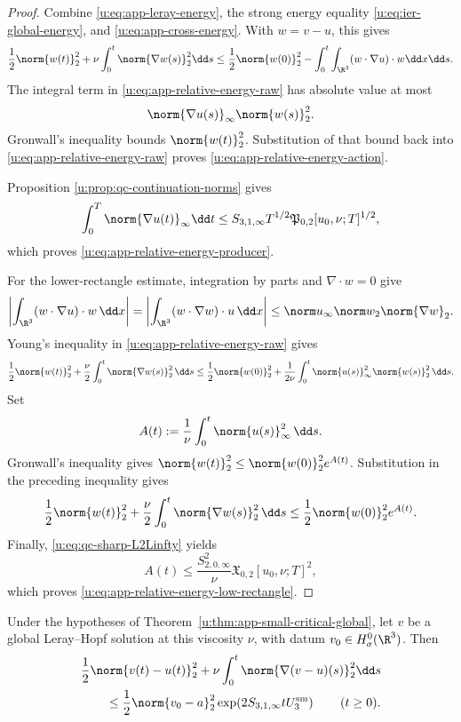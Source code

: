 \begin{proof}
Combine \eqref{u:eq:app-leray-energy}, the strong energy equality
\eqref{u:eq:ier-global-energy}, and \eqref{u:eq:app-cross-energy}.  With
\(w=v-u\), this gives
\begin{equation}
 \frac12\norm{w(t)}_2^2
 +\nu\int_0^t\norm{\nabla w(s)}_2^2\dd s
 \le
 \frac12\norm{w(0)}_2^2
 -\int_0^t\int_{\R^3}(w\cdot\nabla u)\cdot w\dd x\dd s.
 \label{u:eq:app-relative-energy-raw}
\end{equation}
The integral term in \eqref{u:eq:app-relative-energy-raw} has absolute value at
most
\[
 \norm{\nabla u(s)}_\infty\norm{w(s)}_2^2.
\]
Gronwall's inequality bounds \(\norm{w(t)}_2^2\).  Substitution of that
bound back into \eqref{u:eq:app-relative-energy-raw} proves
\eqref{u:eq:app-relative-energy-action}.
\begin{samepage}
Proposition
\ref{u:prop:qc-continuation-norms} gives
\[
 \int_0^T\norm{\nabla u(t)}_\infty\dd t
 \le
 S_{3,1,\infty}T^{1/2}
 \mathfrak P_{0,2}[u_0,\nu;T]^{1/2},
\]
which proves \eqref{u:eq:app-relative-energy-producer}.
\end{samepage}

For the lower-rectangle estimate, integration by parts and
\(\nabla\cdot w=0\) give
\[
 \left|\int_{\R^3}(w\cdot\nabla u)\cdot w\,\dd x\right|
 =\left|\int_{\R^3}(w\cdot\nabla w)\cdot u\,\dd x\right|
 \le\norm u_\infty\norm w_2\norm{\nabla w}_2.
\]
Young's inequality in \eqref{u:eq:app-relative-energy-raw} gives
\begin{align*}
 \frac12\norm{w(t)}_2^2
 +\frac\nu2\int_0^t\norm{\nabla w(s)}_2^2\,\dd s
 \le\frac12\norm{w(0)}_2^2
 +\frac1{2\nu}\int_0^t\norm{u(s)}_\infty^2
 \norm{w(s)}_2^2\,\dd s.
\end{align*}
Set
\[
 A(t):=\frac1\nu\int_0^t\norm{u(s)}_\infty^2\,\dd s.
\]
Gronwall's inequality gives
\(\norm{w(t)}_2^2\le\norm{w(0)}_2^2e^{A(t)}\).  Substitution in the
preceding inequality gives
\[
 \frac12\norm{w(t)}_2^2
 +\frac\nu2\int_0^t\norm{\nabla w(s)}_2^2\,\dd s
 \le\frac12\norm{w(0)}_2^2e^{A(t)}.
\]
Finally, \eqref{u:eq:qc-sharp-L2Linfty} yields
\[
 A(t)\le\frac{S_{2,0,\infty}^2}{\nu}
 \mathfrak X_{0,2}[u_0,\nu;T]^2,
\]
which proves \eqref{u:eq:app-relative-energy-low-rectangle}.
\end{proof}

\begin{corollary}
\label{u:cor:app-small-weak-stability}
Under the hypotheses of Theorem~\ref{u:thm:app-small-critical-global}, let
\(v\) be a global Leray--Hopf solution at this viscosity \(\nu\), with
datum \(v_0\in H^0_\sigma(\R^3)\).
Then
\begin{align}
 &\frac12\norm{v(t)-u(t)}_2^2
 +\nu\int_0^t\norm{\nabla(v-u)(s)}_2^2\dd s
 \notag\\
 &\qquad\le
 \frac12\norm{v_0-a}_2^2
 \exp\!\left(2S_{3,1,\infty}tU_3^{\rm sm}\right)
 \qquad(t\ge0).
 \label{u:eq:app-small-weak-stability}
\end{align}
\end{corollary}

